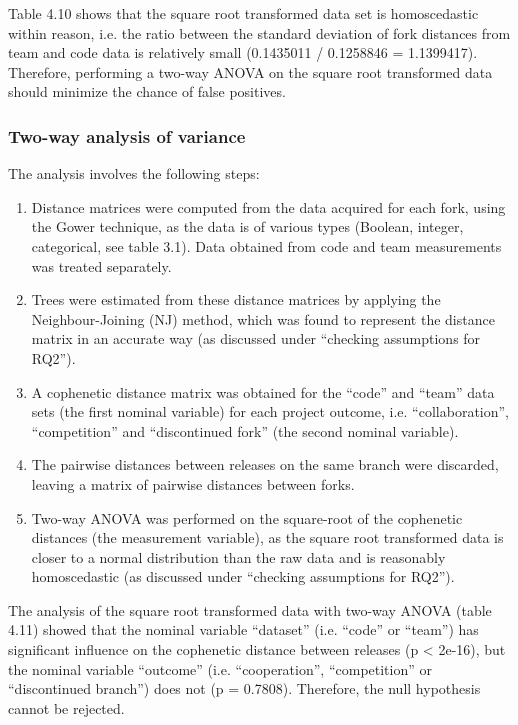 
\noindent
Table 4.10 shows that the square root transformed data set is homoscedastic within reason, i.e. the ratio between the standard deviation of fork distances from team and code data is relatively small (0.1435011 / 0.1258846 = 1.1399417). Therefore, performing a two-way ANOVA on the square root transformed data should minimize the chance of false positives.

\subsubsection{Two-way analysis of variance}
The analysis involves the following steps:

\begin{enumerate}
\item{Distance matrices were computed from the data acquired for each fork, using the Gower technique, as the data is of various types (Boolean, integer, categorical, see table 3.1). Data obtained from code and team measurements was treated separately.}
\item{Trees were estimated from these distance matrices by applying the Neighbour-Joining (NJ) method, which was found to represent the distance matrix in an accurate way (as discussed under “checking assumptions for RQ2”).}
\item{A cophenetic distance matrix was obtained for the “code” and “team” data sets (the first nominal variable) for each project outcome, i.e. “collaboration”, “competition” and “discontinued fork” (the second nominal variable).}
\item{The pairwise distances between releases on the same branch were discarded, leaving a matrix of pairwise distances between forks.}
\item{Two-way ANOVA was performed on the square-root of the cophenetic distances (the measurement variable), as the square root transformed data is closer to a normal distribution than the raw data and is reasonably homoscedastic (as discussed under “checking assumptions for RQ2”).}
\end{enumerate}

The analysis of the square root transformed data with two-way ANOVA (table 4.11) showed that the nominal variable “dataset” (i.e. “code” or “team”) has significant influence on the cophenetic distance between releases (p < 2e-16), but the nominal variable “outcome” (i.e. “cooperation”, “competition” or “discontinued branch”) does not (p = 0.7808). Therefore, the null hypothesis cannot be rejected.

